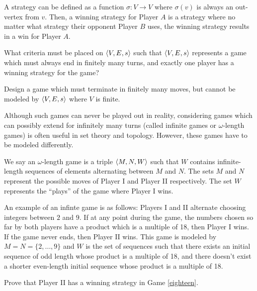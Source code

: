 \begin{definition}
A strategy can be defined as a function $\sigma:V\to V$ where $\sigma(v)$ is always an out-vertex from $v$. Then, a winning strategy for Player $A$ is a strategy where no matter what strategy their opponent Player $B$ uses, the winning strategy results in a win for Player $A$.
\end{definition}

\begin{question}
What criteria must be placed on $\langle V,E,s\rangle$ such that $\langle V,E,s\rangle$ represents a game which must always end in finitely many turns, and exactly one player has a winning strategy for the game?
\end{question}

\begin{question}
Design a game which must terminate in finitely many moves, but cannot be modeled by $\langle V,E,s\rangle$ where $V$ is finite.
\end{question}

Although such games can never be played out in reality, considering games which can possibly extend for infinitely many turns (called infinite games or $\omega$-length games) is often useful in set theory and topology. However, these games have to be modeled differently.

\begin{definition}
We say an $\omega$-length game is a triple $\langle M,N,W\rangle$ such that $W$ contains infinite-length sequences of elements alternating between $M$ and $N$. The sets $M$ and $N$ represent the possible moves of Player I and Player II respectively. The set $W$ represents the ``plays'' of the game where Player I wins.
\end{definition}

\begin{game}\label{eighteen}
An example of an infinte game is as follows: Players I and II alternate choosing integers between $2$ and $9$. If at any point during the game, the numbers chosen so far by both players have a product which is a multiple of 18, then Player I wins. If the game never ends, then Player II wins. This game is modeled by $M=N=\{2,\dots,9\}$ and $W$ is the set of sequences such that there exists an initial sequence of odd length whose product is a multiple of 18, and there doesn't exist a shorter even-length initial sequence whose product is a multiple of 18.
\end{game}

\begin{question}
Prove that Player II has a winning strategy in Game \ref{eighteen}.
\end{question}

